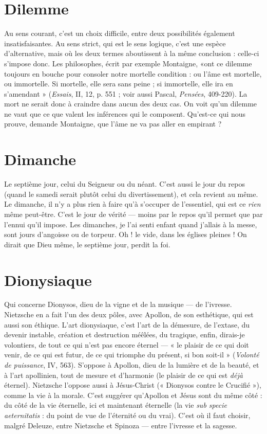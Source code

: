 \section{Dilemme}
Au sens courant, c’est un choix difficile, entre deux possibilités
également insatisfaisantes. Au sens strict, qui est le sens logique,
c’est une espèce d’alternative, mais où les deux termes aboutissent à la même
conclusion : celle-ci s'impose donc. Les philosophes, écrit par exemple Montaigne,
«ont ce dilemme toujours en bouche pour consoler notre mortelle condition : ou
l’âme est mortelle, ou immortelle. Si mortelle, elle sera sans peine ; si immortelle,
elle ira en s’amendant » ({\it Essais}, II, 12, p. 551 ; voir aussi Pascal, {\it Pensées}, 409-220).
La mort ne serait donc à craindre dans aucun des deux cas. On voit qu'un
dilemme ne vaut que ce que valent les inférences qui le composent. Qu'est-ce qui
nous prouve, demande Montaigne, que l’âme ne va pas aller en empirant ?

\section{Dimanche}
Le septième jour, celui du Seigneur ou du néant. C’est aussi
le jour du repos (quand le samedi serait plutôt celui du divertissement),
et cela revient au même. Le dimanche, il n’y a plus rien à faire qu’à
s'occuper de l'essentiel, qui est ce {\it rien} même peut-être. C’est le jour de vérité
— moins par le repos qu’il permet que par l'ennui qu’il impose. Les dimanches,
je l’ai senti enfant quand j'allais à la messe, sont jours d’angoisse ou de torpeur.
Oh ! le vide, dans les églises pleines ! On dirait que Dieu même, le septième
jour, perdit la foi.

\section{Dionysiaque}
Qui concerne Dionysos, dieu de la vigne et de la musique
— de l'ivresse. Nietzsche en a fait l’un des deux pôles, avec
Apollon, de son esthétique, qui est aussi son éthique. L’art dionysiaque, c’est
l’art de la démesure, de l’extase, du devenir instable, création et destruction
méêlées, du tragique, enfin, dirais-je volontiers, de tout ce qui n’est pas encore
éternel — « le plaisir de ce qui doit venir, de ce qui est futur, de ce qui triomphe
du présent, si bon soit-il » ({\it Volonté de puissance}, IV, 563). S’oppose à Apollon,
dieu de la lumière et de la beauté, et à l’art apollinien, tout de mesure et d’harmonie
(le plaisir de ce qui est {\it déjà} éternel). Nietzsche l’oppose aussi à Jésus-Christ
(« Dionysos contre le Crucifié »), comme la vie à la morale. C’est suggérer
qu’Apollon et Jésus sont du même côté : du côté de la vie éternelle, ici et
maintenant éternelle (la vie {\it sub specie aeternitatis} : du point de vue de l’éternité
ou du vrai). C’est où il faut choisir, malgré Deleuze, entre Nietzsche et Spinoza
— entre l’ivresse et la sagesse.

